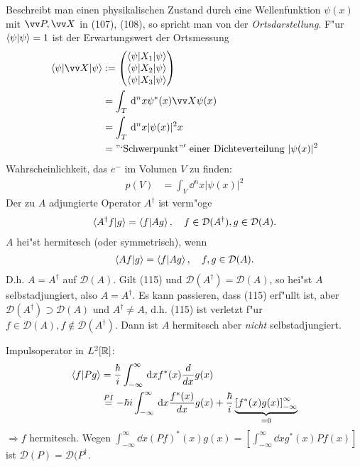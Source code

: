 \documentclass[a4paper]{scrartcl}
\begin{document}
{Beschreibt man einen physikalischen Zustand durch eine Wellenfunktion $\psi(x)$ mit $\vv P, \vv X$ in (107), (108), so spricht man von der \emph{Ortsdarstellung}. F"ur $\braket{ \psi | \psi} = 1$ ist der Erwartungswert der Ortsmessung
\begin{align}
\begin{split}
\braket{ \psi | \vv X | \psi} & := \matr{  \braket{ \psi |  X_1 | \psi} \\ \braket{ \psi |  X_2 | \psi} \\ \braket{ \psi |  X_3 | \psi} } \\
& = \int_T \dd^nx \psi^*(x) \vv X \psi(x) \\
& = \int_T \dd^n x \vert \psi(x) \vert^2 x \\
& = \mathrm{"`Schwerpunkt"' \ einer \ Dichteverteilung \ } \vert \psi(x) \vert^2
\end{split}
\end{align}
Wahrscheinlichkeit, das $e^-$ im Volumen $V$ zu finden:
\begin{align}
p(V) & = \int_V \dd^nx \vert \psi(x) \vert^2
\end{align}
Der zu $A$ adjungierte Operator $A^\dagger$ ist verm"oge
\begin{align}
\braket{ A^\dagger f | g} = \braket{ f | Ag}, \quad f \in \mathcal D(A^\dagger), g \in \mathcal D(A).
\end{align}
$A$ hei"st hermitesch (oder symmetrisch), wenn 
\begin{align}
\braket{ Af | g} = \braket{ f  | Ag }, \quad f,g \in \mathcal D(A).
\end{align}
D.h. $A = A^\dagger$ auf $\mathcal D(A)$. Gilt (115) und $\mathcal D(A^\dagger) = \mathcal D(A)$, so hei"st $A$ selbstadjungiert, also $A = A^\dagger$. Es kann passieren, dass (115) erf"ullt ist, aber $\mathcal D(A^\dagger) \supset \mathcal D(A)$ und $A^\dagger \neq A$, d.h. (115) ist verletzt f"ur $f \in \mathcal D(A), f \notin \mathcal D(A^\dagger)$. Dann ist $A$ hermitesch aber \emph{nicht} selbstadjungiert.

Impulsoperator in $L^2[\mathbb{R}]$:
\begin{align*}
\braket{ f | Pg} & = \frac \hbar i \int_{-\infty}^\infty \, \mathrm{d} x f^*(x) \frac d {dx} g(x) \\
& \stackrel {PI}= -\hbar i \int_{-\infty}^\infty \, \mathrm{d} x \frac{ f^*(x)}{dx} g(x) + \frac \hbar i \underbrace{\left[ f^*(x) g(x) \right]_{-\infty}^\infty}_{=0}
\end{align*}
$\Longrightarrow f$ hermitesch. Wegen $\int_{-\infty}^\infty \dd x (Pf)^*(x) g(x) = \left[ \int_{-\infty}^\infty \dd x g^*(x) Pf(x) \right]$ ist $\mathcal D(P) = \mathcal D(P^\dagger$.

}
\end{document}
